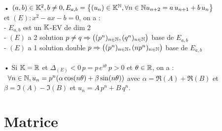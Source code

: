 \documentclass[12 pt]{exampleclass}
\begin{document}
\begin{flushleft}
\begin{doublespace}
	\text{ }\\
	• $(a,b)\in\mathbb{K}^2 , b\ne 0 , E_{a,b} = \big\{ (u_n)\in\mathbb{K}^{\mathbb{N}} , \forall n\in\mathbb{N} u_{n+2} = a\, u_{n+1} + b\, u_n\big\}$\\
	et $(E) : x^2 - ax - b =0$, on a :\\
	 - $E_{a,b}$ est un $\mathbb{K}$-EV de dim 2\\
     - $(E)$ a 2 solution $p\ne q \Rightarrow \big( (p^n)_{n\in\mathbb{N}} , (q^n)_{n\in\mathbb{N}} \big)$ base de $E_{a,b}$\\
     - $(E)$ a 1 solution double $p \Rightarrow \big( (p^n)_{n\in\mathbb{N}} , (n p^n)_{n\in\mathbb{N}} \big)$ base de $E_{a,b}$\\
    \text{}\\
	• Si $\mathbb{K} = \mathbb{R}$ et $\Delta_{(E)} < 0 \, p=p \, e^{i\theta} \ p>0$ et $\theta\in\mathbb{R}$, on a :\\
	\qquad \ $\forall n\in\mathbb{N} , u_n = p^n (\alpha \cos(n \theta) + \beta \sin(n \theta) )$ avec $\alpha = \Re(A) + \Re(B)$ et $\beta = \Im(A) - \Im(B)$ et $u_n = A \, p^n + B \, q^n$.\\
	

\end{doublespace}
\end{flushleft}

\section{Matrice}
\end{document}
